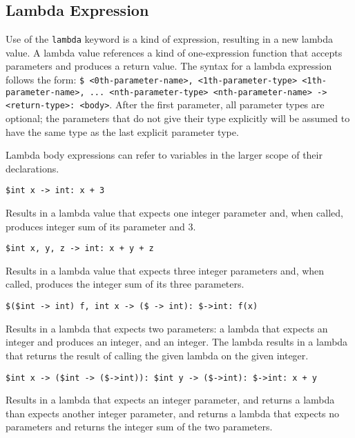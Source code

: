 
\subsection{Lambda Expression}
{
	Use of the \texttt{lambda} keyword is a kind of expression, resulting
	in a new lambda value. A lambda value references a kind of
	one-expression function that accepts parameters and produces a return value.
	The syntax for a lambda expression follows the
	form: \texttt{\$<0th-parameter-type> <0th-parameter-name>,
	<1th-parameter-type> <1th-parameter-name>, ... <nth-parameter-type>
	<nth-parameter-name> -> <return-type>: <body>}.
	After the first parameter, all parameter types are optional; the
	parameters that do not give their type explicitly will be assumed to
	have the same type as the last explicit parameter type.
	
	Lambda body expressions can refer to variables in the larger scope of their
	declarations.
	
	\begin{itemize}
	{
		\item \texttt{\$int x -> int: x + 3}
		
			Results in a lambda value that expects
			one integer parameter and, when called, produces integer sum
			of its parameter and 3.
		
		\item \texttt{\$int x, y, z -> int: x + y + z}
		
			Results in a lambda value that expects
			three integer parameters and, when called, produces the integer sum
			of its three parameters.
		
		\item \texttt{\$(\$int -> int) f, int x -> (\$ -> int): \$->int: f(x)}
		
			Results in a lambda that expects two parameters:
			a lambda that expects an integer and produces an integer,
			and an integer. The lambda results in a lambda that returns the
			result of calling the given lambda on the given integer.
		
		\item \texttt{\$int x -> (\$int -> (\$->int)): \$int y -> (\$->int): \$->int: x + y}
		
			Results in a lambda that expects an integer parameter, and returns
			a lambda than expects another integer parameter, and returns
			a lambda that expects no parameters and returns the integer sum
			of the two parameters.
	}
	\end{itemize}
}














